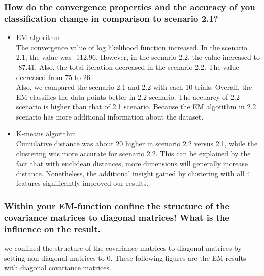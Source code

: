 \documentclass[a4paper]{article}
\begin{document}
\clearpage

	\subsubsection{How do the convergence properties and the accuracy of you classification change in comparison to scenario 2.1? }
	\begin{itemize}
		\item EM-algorithm \\
		The convergence value of log likelihood function increased. In the scenario 2.1, the value was -112.96. However, in the scenario 2.2, the value increased to -87.41. Also, the total iteration decreased in the scenario 2.2. The value decreased from 75 to 26.\\
		Also, we compared the scenario 2.1 and 2.2 with each 10 trials. Overall, the EM classifies the data points better in 2.2 scenario. The accuarcy of 2.2 scenario is higher than that of 2.1 scenario. Because the EM algorithm in 2.2 scenario has more additional information about the dataset.
		
		\item K-means algorithm \\
		Cumulative distance was about 20 higher in scenario 2.2 versus 2.1, while the clustering was more accurate for scenario 2.2.  This can be explained by the fact that with euclidean distances, more dimensions will generally increase distance.  Nonetheless, the additional insight gained by clustering with all 4 features significantly improved our results.
		 
	\end{itemize}
	
	\clearpage
	\subsubsection{Within your EM-function confine the structure of the covariance matrices to diagonal matrices! What is the inﬂuence on the result.}
	we confined the structure of the covariance matrices to diagonal matrices by setting non-diagonal matrices to 0. These following figures are the EM results with diagonal covariance matrices.
	
\end{document}
